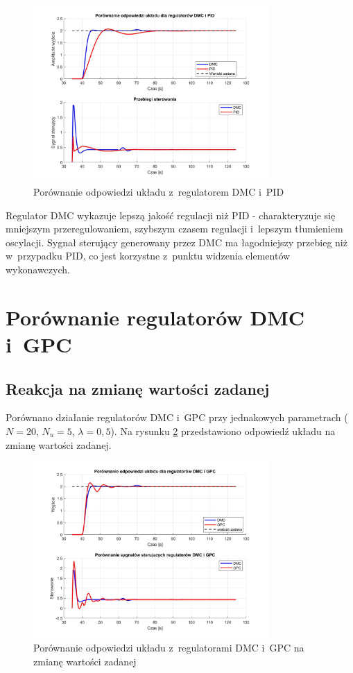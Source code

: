 \documentclass[a4paper,titlepage,11pt,floatssmall]{mwrep}
\begin{document}
\begin{figure}[H]
    \centering
    \includegraphics[width=0.8\textwidth]{kod/wykresy/optimal_solution.jpg}
    \caption{Porównanie odpowiedzi układu z~regulatorem DMC i~PID}
    \label{fig:dmc_pid}
\end{figure}

Regulator DMC wykazuje lepszą jakość regulacji niż PID - charakteryzuje się mniejszym przeregulowaniem, szybszym czasem regulacji i~lepszym tłumieniem oscylacji. Sygnał sterujący generowany przez DMC ma łagodniejszy przebieg niż w~przypadku PID, co jest korzystne z~punktu widzenia elementów wykonawczych.

\section{Porównanie regulatorów DMC i~GPC}

\subsection{Reakcja na zmianę wartości zadanej}

Porównano działanie regulatorów DMC i~GPC przy jednakowych parametrach ($N = 20$, $N_u = 5$, $\lambda = 0,5$). Na rysunku \ref{fig:dmc_gpc_setpoint} przedstawiono odpowiedź układu na zmianę wartości zadanej.

\begin{figure}[H]
    \centering
    \includegraphics[width=0.8\textwidth]{kod/wykresy/DMC_vs_GPC_setpoint.jpg}
    \caption{Porównanie odpowiedzi układu z~regulatorami DMC i~GPC na zmianę wartości zadanej}
    \label{fig:dmc_gpc_setpoint}
\end{figure}
\end{document}
